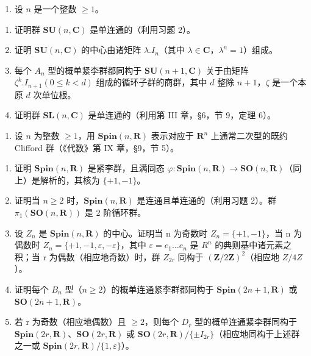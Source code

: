 \begin{enumerate}
\def\labelenumi{\arabic{enumi})}
\setcounter{enumi}{3}
\tightlist
\item
  设 \(n\) 是一个整数 \(\geq 1\)。
\end{enumerate}

\begin{enumerate}
\def\labelenumi{\alph{enumi})}
\item
  证明群 \(\mathbf{SU}(n,\mathbf{C})\) 是单连通的（利用习题 2）。
\item
  证明 \(\mathbf{SU}(n,\mathbf{C})\) 的中心由诸矩阵 \(\lambda .I_n\)（其中 \(\lambda \in \mathbf{C}\)，\(\lambda^n = 1\)）组成。
\item
  每个 \(A_{n}\) 型的概单紧李群都同构于 \(\mathbf{SU}(n+1,\mathbf{C})\) 关于由矩阵 \(\zeta^k. I_{n+1} (0 \leq k < d)\) 组成的循环子群的商群，其中 \(d\) 整除 \(n + 1\)，\(\zeta\) 是一个本原 \(d\) 次单位根。
\item
  证明群 \(\mathbf{SL}(n,\mathbf{C})\) 是单连通的（利用第 III 章，§6，节 9，定理 6）。
\end{enumerate}

\begin{enumerate}
\def\labelenumi{\arabic{enumi})}
\setcounter{enumi}{4}
\tightlist
\item
  设 \(n\) 为整数 \(\geq 1\)，用 \(\mathbf{Spin}(n, \mathbf{R})\) 表示对应于 \(\mathbf{R}^n\) 上通常二次型的既约 Clifford 群（《代数》第 IX 章，§9，节 5）。
\end{enumerate}

\begin{enumerate}
\def\labelenumi{\alph{enumi})}
\item
  证明 \(\mathbf{Spin}(n,\mathbf{R})\) 是紧李群，且满同态 \(\varphi:\mathbf{Spin}(n,\mathbf{R})\to\mathbf{SO}(n,\mathbf{R})\)（同上）是解析的，其核为 \(\{+1,-1\}\)。
\item
  证明当 \(n \geq 2\) 时，\(\mathbf{Spin}(n, \mathbf{R})\) 是连通且单连通的（利用习题 2）。群 \(\pi_{1}(\mathbf{SO}(n, \mathbf{R}))\) 是 2 阶循环群。
\item
  设 \(Z_{n}\) 是 \(\mathbf{Spin}(n,\mathbf{R})\) 的中心。证明当 n 为奇数时 \(Z_{n}=\{+1,-1\}\)，当 n 为偶数时 \(Z_{n}=\{+1,-1,\varepsilon,-\varepsilon\}\)，其中 \(\varepsilon=e_{1}\ldots e_{n}\) 是 \(R^{n}\) 的典则基中诸元素之积；当 r 为偶数（相应地奇数）时，群 \(Z_{2r}\) 同构于 \((\mathbf{Z}/2\mathbf{Z})^{2}\)（相应地 \(Z/4Z\)）。
\item
  证明每个 \(B_{n}\) 型（\(n \geq 2\)）的概单连通紧李群都同构于 \(\mathbf{Spin}(2n + 1, \mathbf{R})\) 或 \(\mathbf{SO}(2n + 1, \mathbf{R})\)。
\item
  若 r 为奇数（相应地偶数）且 \(\geq 2\)，则每个 \(D_{r}\) 型的概单连通紧李群同构于 \(\mathbf{Spin}(2r,\mathbf{R})\)、\(\mathbf{SO}(2r,\mathbf{R})\) 或 \(\mathbf{SO}(2r,\mathbf{R})/\{\pm I_{2r}\}\)（相应地同构于上述群之一或 \(\mathbf{Spin}(2r,\mathbf{R})/\{1,\varepsilon\}\)）。
\end{enumerate}

